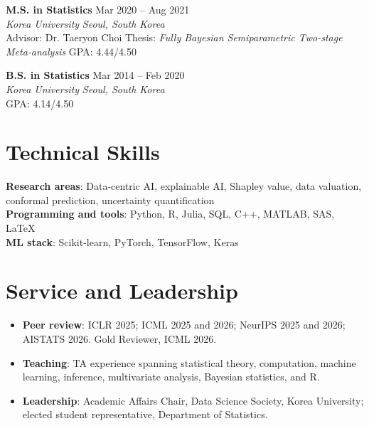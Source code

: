 \documentclass[letterpaper,10pt]{article}
\newcommand{\eduline}[4]{%
  \textbf{#1} \hfill {\color{muted}#2}\\
  \textit{#3} \hfill \textit{#4}\\[-1pt]
}
\newcommand{\detailline}[1]{%
  {\small\color{muted}#1}\vspace{2pt}
}
\begin{document}
\vspace{2pt}
\eduline{M.S. in Statistics}{Mar 2020 -- Aug 2021}{Korea University}{Seoul, South Korea}
\detailline{Advisor: Dr. Taeryon Choi \quad Thesis: \textit{Fully Bayesian Semiparametric Two-stage Meta-analysis} \quad GPA: 4.44/4.50}

\vspace{2pt}
\eduline{B.S. in Statistics}{Mar 2014 -- Feb 2020}{Korea University}{Seoul, South Korea}
\detailline{GPA: 4.14/4.50}

\section{Technical Skills}
\textbf{Research areas}: Data-centric AI, explainable AI, Shapley value, data valuation, conformal prediction, uncertainty quantification\\
\textbf{Programming and tools}: Python, R, Julia, SQL, C++, MATLAB, SAS, LaTeX\\
\textbf{ML stack}: Scikit-learn, PyTorch, TensorFlow, Keras

\section{Service and Leadership}
\begin{itemize}
  \item \textbf{Peer review}: ICLR 2025; ICML 2025 and 2026; NeurIPS 2025 and 2026; AISTATS 2026. Gold Reviewer, ICML 2026.
  \item \textbf{Teaching}: TA experience spanning statistical theory, computation, machine learning, inference, multivariate analysis, Bayesian statistics, and R.
  \item \textbf{Leadership}: Academic Affairs Chair, Data Science Society, Korea University; elected student representative, Department of Statistics.
\end{itemize}
\end{document}
